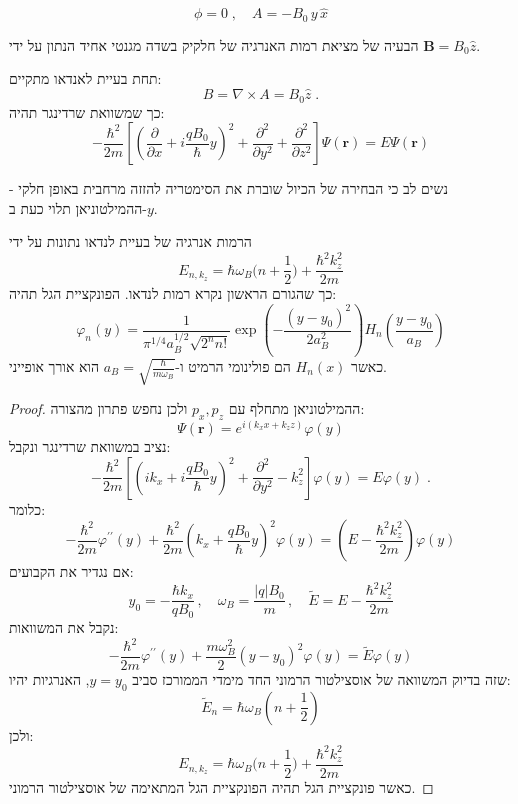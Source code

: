 \documentclass{tstextbook}
\begin{document}
\begin{definition}
$$\phi=0\;,\quad A=-B_{0}\,y\,\hat{x}$$

\end{definition}
\begin{definition}
הבעיה של מציאת רמות האנרגיה של חלקיק בשדה מגנטי אחיד הנתון על ידי \(\mathbf{B}=B_{0}\hat{z}\).

\end{definition}
\begin{proposition}
תחת בעיית לאנדאו מתקיים:
$$B=\nabla\times A=B_{0}\hat{z}\;.$$
כך שמשוואת שרדינגר תהיה:
$$-\frac{\hbar^{2}}{2m}\left[\left(\frac{\partial}{\partial x}+i\frac{q B_{0}}{\hbar}y\right)^{2}+\frac{\partial^{2}}{\partial y^{2}}+\frac{\partial^{2}}{\partial z^{2}}\right]\Psi(\mathbf{r})=E\Psi(\mathbf{r})$$

\end{proposition}
\begin{remark}
נשים לב כי הבחירה של הכיול שוברת את הסימטריה להזזה מרחבית באופן חלקי - ההמילטוניאן תלוי כעת ב-\(y\).

\end{remark}
\begin{proposition}
הרמות אנרגיה של בעיית לנדאו נתונות על ידי
$$E_{n,k_{z}}=\hbar\omega_{B}\big(n+\frac{1}{2}\big)+\frac{\hbar^{2}k_{z}^{2}}{2m}$$
כך שהגורם הראשון נקרא רמות לנדאו. הפונקציית הגל תהיה:
$$\varphi_{n}(y)=\frac{1}{\pi^{1/4}a_{B}^{1/2}\sqrt{2^{n}n!}}\exp\left(-\frac{(y-y_{0})^{2}}{2a_{B}^{2}}\right)H_{n}\left(\frac{y-y_{0}}{a_{B}}\right)$$
כאשר \(H_{n}(x)\) הם פולינומי הרמיט ו-\(a_{B}=\sqrt{ \frac{\hbar}{m\omega_{B}} }\) הוא אורך אופייני.

\end{proposition}
\begin{proof}
ההמילטוניאן מתחלף עם \(p_{x},p_{z}\) ולכן נחפש פתרון מהצורה:
$$\Psi(\mathbf{r})=e^{i(k_{x}x+k_{z}z)}\varphi(y)$$
נציב במשוואת שרדינגר ונקבל:
$$-\frac{\hbar^{2}}{2m}\left[\left(i k_{x}+i\frac{q B_{0}}{\hbar}y\right)^{2}+\frac{\partial^{2}}{\partial y^{2}}-k_{z}^{2}\right]\varphi(y)=E\varphi(y)\;.$$
כלומר:
$$-\frac{\hbar^{2}}{2m}\varphi^{\prime\prime}(y)+\frac{\hbar^{2}}{2m}\left(k_{x}+\frac{q B_{0}}{\hbar}y\right)^{2}\varphi(y)=\left(E-\frac{\hbar^{2}k_{z}^{2}}{2m}\right)\varphi(y)$$
אם נגדיר את הקבועים:
$$y_{0}=-\frac{\hbar k_{x}}{q B_{0}}\,,\quad\omega_{B}=\frac{|q|B_{0}}{m}\,,\quad\tilde{E}=E-\frac{\hbar^{2}k_{z}^{2}}{2m}$$
נקבל את המשוואות:
$$-\frac{\hbar^{2}}{2m}\varphi^{\prime\prime}(y)+\frac{m\omega_{B}^{2}}{2}\left(y-y_{0}\right)^{2}\varphi(y)=\tilde{E}\varphi(y)$$
שזה בדיוק המשוואה של אוסצילטור הרמוני החד מימדי הממורכז סביב \(y=y_{0}\), האנרגיות יהיו:
$$\tilde{E}_{n}=\hbar\omega_{B}(n+\frac{1}{2})$$
ולכן:
$$E_{n,k_{z}}=\hbar\omega_{B}\big(n+\frac{1}{2}\big)+\frac{\hbar^{2}k_{z}^{2}}{2m}$$
כאשר פונקציית הגל תהיה הפונקציית הגל המתאימה של אוסצילטור הרמוני.

\end{proof}
\end{document}
